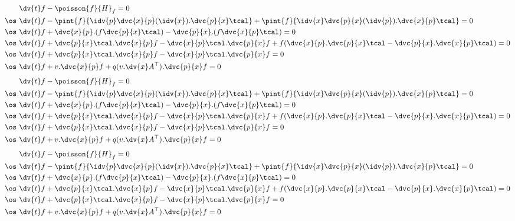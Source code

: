 \begin{align}
	        & \dv{t}f-\poisson{f}{H}_f=0                                                                                                 \\
\os\,\,         & \dv{t}f-\pint{f}{\idv{p}\dvc{x}{p}(\idv{x}).\dvc{p}{x}\tcal}+\pint{f}{\idv{x}\dvc{p}{x}(\idv{p}).\dvc{x}{p}\tcal}=0        \\
\os\,\,         & \dv{t}f+\dvc{x}{p}.(f\dvc{p}{x}\tcal)-\dvc{p}{x}.(f\dvc{x}{p}\tcal)=0                                                      \\
\os\,\,         & \dv{t}f+\dvc{p}{x}\tcal.\dvc{x}{p}f-\dvc{x}{p}\tcal.\dvc{p}{x}f+f(\dvc{x}{p}.\dvc{p}{x}\tcal-\dvc{p}{x}.\dvc{x}{p}\tcal)=0 \\
\os\,\,         & \dv{t}f+\dvc{p}{x}\tcal.\dvc{x}{p}f-\dvc{x}{p}\tcal.\dvc{p}{x}f=0                                                          \\
\os\,\,         & \dv{t}f+v.\dvc{x}{p}f+q(v.\dv{x}A^\top).\dvc{p}{x}f=0
\end{align}
\begin{align}
	        & \dv{t}f-\poisson{f}{H}_f=0                                                                                                 \\
\os\,\,         & \dv{t}f-\pint{f}{\idv{p}\dvc{x}{p}(\idv{x}).\dvc{p}{x}\tcal}+\pint{f}{\idv{x}\dvc{p}{x}(\idv{p}).\dvc{x}{p}\tcal}=0        \\
\os\,\,         & \dv{t}f+\dvc{x}{p}.(f\dvc{p}{x}\tcal)-\dvc{p}{x}.(f\dvc{x}{p}\tcal)=0                                                      \\
\os\,\,         & \dv{t}f+\dvc{p}{x}\tcal.\dvc{x}{p}f-\dvc{x}{p}\tcal.\dvc{p}{x}f+f(\dvc{x}{p}.\dvc{p}{x}\tcal-\dvc{p}{x}.\dvc{x}{p}\tcal)=0 \\
\os\,\,         & \dv{t}f+\dvc{p}{x}\tcal.\dvc{x}{p}f-\dvc{x}{p}\tcal.\dvc{p}{x}f=0                                                          \\
\os\,\,         & \dv{t}f+v.\dvc{x}{p}f+q(v.\dv{x}A^\top).\dvc{p}{x}f=0
\end{align}
\begin{align}
	        & \dv{t}f-\poisson{f}{H}_f=0                                                                                                 \\
\os\,\,         & \dv{t}f-\pint{f}{\idv{p}\dvc{x}{p}(\idv{x}).\dvc{p}{x}\tcal}+\pint{f}{\idv{x}\dvc{p}{x}(\idv{p}).\dvc{x}{p}\tcal}=0        \\
\os\,\,         & \dv{t}f+\dvc{x}{p}.(f\dvc{p}{x}\tcal)-\dvc{p}{x}.(f\dvc{x}{p}\tcal)=0                                                      \\
\os\,\,         & \dv{t}f+\dvc{p}{x}\tcal.\dvc{x}{p}f-\dvc{x}{p}\tcal.\dvc{p}{x}f+f(\dvc{x}{p}.\dvc{p}{x}\tcal-\dvc{p}{x}.\dvc{x}{p}\tcal)=0 \\
\os\,\,         & \dv{t}f+\dvc{p}{x}\tcal.\dvc{x}{p}f-\dvc{x}{p}\tcal.\dvc{p}{x}f=0                                                          \\
\os\,\,         & \dv{t}f+v.\dvc{x}{p}f+q(v.\dv{x}A^\top).\dvc{p}{x}f=0
\end{align}


